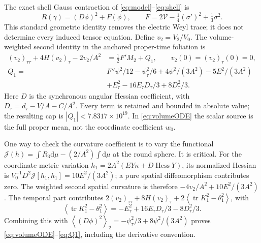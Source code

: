 \documentclass[11pt]{article}
\newcommand{\dd}{\mathrm d}
\newcommand{\av}[1]{\left\langle #1\right\rangle}
\begin{document}
The exact shell Gauss contraction of \eqref{eq:model}--\eqref{eq:shell}
is
\begin{equation}
 R(\gamma)=(D\phi)^2+F(\phi),\qquad
 F=2\mathcal V-\tfrac14(\sigma')^2+\tfrac13\sigma^2. \label{eq:gauss}
\end{equation}
This standard geometric identity removes the electric Weyl trace; it
does not determine every induced tensor equation. Define
$v_2=V_2/V_0$. The volume-weighted second identity in the anchored
proper-time foliation is
\begin{align}
 (v_2)_{\tau\tau}+4H(v_2)_\tau-2v_2/A^2
    &=\tfrac12F'M_2+Q_1,\qquad v_2(0)=(v_2)_\tau(0)=0,
 \label{eq:volumeODE}\\
 Q_1={}&F''\psi^2/12-\psi_\tau^2/6+4\psi^2/(3A^2)-5E^2/(3A^2)
 \nonumber\\
 &+E_\tau^2-16E_\tau D_\tau/3+8D_\tau^2/3. \label{eq:Q1}
\end{align}
Here $D$ is the synchronous angular Hessian coefficient, with
$D_\tau=d_\tau-V/A-C/A^2$. Every term is retained and bounded in absolute
value; the resulting cap is $|Q_1|<7.8317\times10^{19}$.
In \eqref{eq:volumeODE} the scalar source is the full proper mean,
not the coordinate coefficient $w_0$.

One way to check the curvature coefficient is to vary the functional
$\mathcal J(h)=\int R_3\dd\mu-(2/A^2)\int\dd\mu$ at the round sphere.
It is critical. For the coordinate metric variation
$h_1=2A^2(EY\kappa+D\operatorname{Hess}Y)$, its normalized Hessian is
$V_0^{-1}D^2\mathcal J[h_1,h_1]=10E^2/(3A^2)$; a pure spatial
diffeomorphism contributes zero.
The weighted second spatial curvature is therefore
$-4v_2/A^2+10E^2/(3A^2)$. The temporal part contributes
$2(v_2)_{\tau\tau}+8H(v_2)_\tau
 +2\av{\operatorname{tr}K_1^2-\theta_1^2}$, with
\begin{equation}
 \av{\operatorname{tr}K_1^2-\theta_1^2}
 =-E_\tau^2+16E_\tau D_\tau/3-8D_\tau^2/3.
\end{equation}
Combining this with
$\av{(D\phi)^2}_2=-\psi_\tau^2/3+8\psi^2/(3A^2)$ proves
\eqref{eq:volumeODE}--\eqref{eq:Q1}, including the derivative convention.
\end{document}
